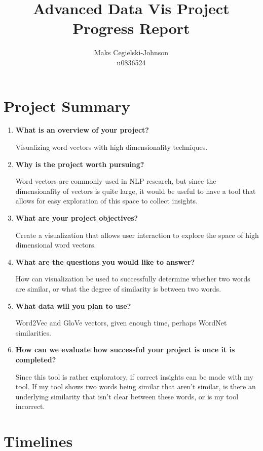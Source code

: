 \documentclass{article}
\title{Advanced Data Vis Project Progress Report}
\author{Maks Cegielski-Johnson\\u0836524}
\begin{document}
\maketitle


\section{Project Summary}

\begin{enumerate}
	\item \textbf{What is an overview of your project?}
	
	Visualizing word vectors with high dimensionality techniques. 
	
	\item \textbf{Why is the project worth pursuing?}
	
	Word vectors are commonly used in NLP research, but since the dimensionality of vectors is quite large, it would be useful to have a tool that allows for easy exploration of this space to collect insights. 
	
	\item \textbf{What are your project objectives?}
	
	Create a visualization that allows user interaction to explore the space of high dimensional word vectors. 
	
	\item \textbf{What are the questions you would like to answer?}
	
	How can visualization be used to successfully determine whether two words are similar, or what the degree of similarity is between two words. 
	
	\item \textbf{What data will you plan to use?}
	
	Word2Vec and GloVe vectors, given enough time, perhaps WordNet similarities. 
	
	\item \textbf{How can we evaluate how successful your project is once it is completed?}
	
	Since this tool is rather exploratory, if correct insights can be made with my tool. If my tool shows two words being similar that aren't similar, is there an underlying similarity that isn't clear between these words, or is my tool incorrect. 
\end{enumerate}




\section{Timelines}
\end{document}
